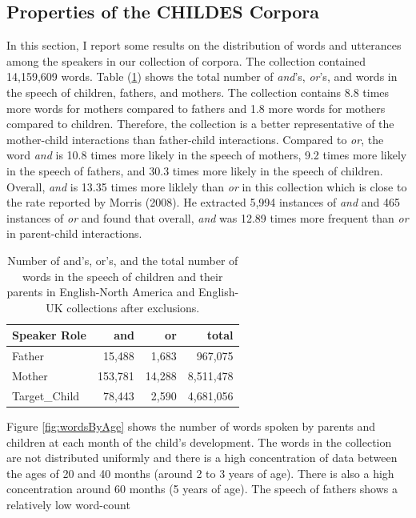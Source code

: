 \documentclass[oneside]{report}
\theoremstyle{definition}
\theoremstyle{definition}
\theoremstyle{definition}
\theoremstyle{remark}
\begin{document}
\subsection{Properties of the CHILDES
Corpora}\label{properties-of-the-childes-corpora}

In this section, I report some results on the distribution of words and
utterances among the speakers in our collection of corpora. The
collection contained 14,159,609 words. Table (\ref{tab:countTable})
shows the total number of \emph{and}'s, \emph{or}'s, and words in the
speech of children, fathers, and mothers. The collection contains 8.8
times more words for mothers compared to fathers and 1.8 more words for
mothers compared to children. Therefore, the collection is a better
representative of the mother-child interactions than father-child
interactions. Compared to \emph{or}, the word \emph{and} is 10.8 times
more likely in the speech of mothers, 9.2 times more likely in the
speech of fathers, and 30.3 times more likely in the speech of children.
Overall, \emph{and} is 13.35 times more liklely than \emph{or} in this
collection which is close to the rate reported by Morris (2008). He
extracted 5,994 instances of \emph{and} and 465 instances of \emph{or}
and found that overall, \emph{and} was 12.89 times more frequent than
\emph{or} in parent-child interactions.
\begin{table}

\caption{\label{tab:countTable}Number of and's, or's, and the total number of words in the speech of children and their parents in English-North America and English-UK collections after exclusions.}
\centering
\begin{tabular}[t]{l|r|r|r}
\hline
Speaker Role & and & or & total\\
\hline
Father & 15,488 & 1,683 & 967,075\\
\hline
Mother & 153,781 & 14,288 & 8,511,478\\
\hline
Target\_Child & 78,443 & 2,590 & 4,681,056\\
\hline
\end{tabular}
\end{table}
Figure \ref{fig:wordsByAge} shows the number of words spoken by parents
and children at each month of the child's development. The words in the
collection are not distributed uniformly and there is a high
concentration of data between the ages of 20 and 40 months (around 2 to
3 years of age). There is also a high concentration around 60 months (5
years of age). The speech of fathers shows a relatively low word-count
\end{document}
